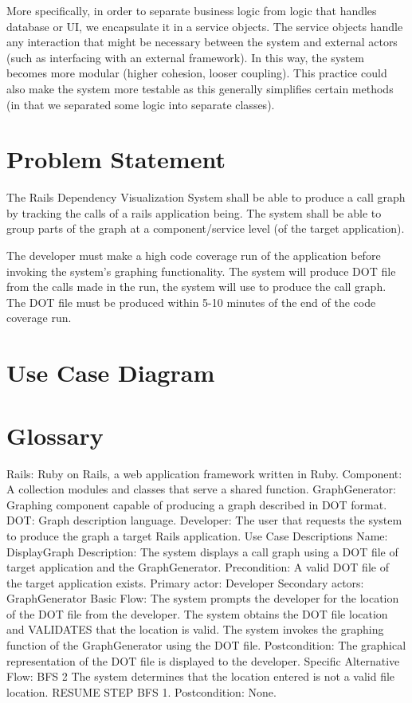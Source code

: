 More specifically, in order to separate business logic from logic that handles database or UI, we encapsulate it in a service objects. The service objects handle any interaction that might be necessary between the system and external actors (such as interfacing with an external framework). In this way, the system becomes more modular (higher cohesion, looser coupling). This practice could also make the system more testable as this generally simplifies certain methods (in that we separated some logic into separate classes). 

\section{Problem Statement}
The Rails Dependency Visualization System shall be able to produce a call graph by tracking the calls of a rails application being. The system shall be able to group parts of the graph at a component/service level (of the target application). 

The developer must make a high code coverage run of the application before invoking the system’s graphing functionality. The system will produce DOT file from the calls made in the run, the system will use to produce the call graph. The DOT file must be produced within 5-10 minutes of the end of the code coverage run. 

\section{Use Case Diagram}

\section{Glossary}
Rails: Ruby on Rails, a web application framework written in Ruby.
Component: A collection modules and classes that serve a shared function.
GraphGenerator: Graphing component capable of producing a graph described in DOT format.
DOT: Graph description language.
Developer: The user that requests the system to produce the graph a target Rails application.
Use Case Descriptions
Name: DisplayGraph
Description: The system displays a call graph using a DOT file of target application and the GraphGenerator.
Precondition: A valid DOT file of the target application exists.
Primary actor: Developer
Secondary actors: GraphGenerator
Basic Flow:
The system prompts the developer for the location of the DOT file from the developer.
The system obtains the DOT file location and VALIDATES that the location is valid.
The system invokes the graphing function of the GraphGenerator using the DOT file.
Postcondition: The graphical representation of the DOT file is displayed to the developer.
Specific Alternative Flow: BFS 2
The system determines that the location entered is not a valid file location.
RESUME STEP BFS 1.
    Postcondition: None.

